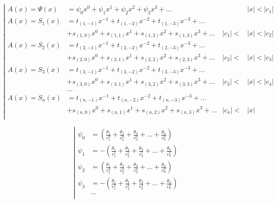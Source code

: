 \begin{equation*} \left| \begin{aligned}
A(x) = \Psi(x) &=
  \psi_0 x^0 
+ \psi_1 x^1
+ \psi_2 x^2 
+ \psi_3 x^3 
+ \ldots &
&|x| < |c_1| \\
%
A(x) = S_1(x) &= 
  t_{(1,-1)} x^{-1}
+ t_{(1,-2)} x^{-2}
+ t_{(1,-3)} x^{-3}
+ \ldots \\ &
+ s_{(1,0)} x^0
+ s_{(1,1)} x^1
+ s_{(1,2)} x^2
+ s_{(1,3)} x^3
+ \ldots &
|c_1| < &|x| < |c_2| \\
%
A(x) = S_2(x) &= 
  t_{(2,-1)} x^{-1}
+ t_{(2,-2)} x^{-2}
+ t_{(2,-3)} x^{-3}
+ \ldots \\ &
+ s_{(2,0)} x^0
+ s_{(2,1)} x^1
+ s_{(2,2)} x^2
+ s_{(2,3)} x^3
+ \ldots &
|c_2| < &|x| < |c_3| \\
%
A(x) = S_3(x) &= 
  t_{(3,-1)} x^{-1}
+ t_{(3,-2)} x^{-2}
+ t_{(3,-3)} x^{-3}
+ \ldots \\ &
+ s_{(3,0)} x^0
+ s_{(3,1)} x^1
+ s_{(3,2)} x^2
+ s_{(3,3)} x^3
+ \ldots &
|c_3| < &|x| < |c_4| \\
%
&\ldots \\
%
A(x) = S_n(x) &= 
  t_{(n,-1)} x^{-1}
+ t_{(n,-2)} x^{-2}
+ t_{(n,-3)} x^{-3}
+ \ldots \\ &
+ s_{(n,0)} x^0
+ s_{(n,1)} x^1
+ s_{(n,2)} x^2
+ s_{(n,3)} x^3
+ \ldots &
|c_n| < &|x| \\
\end{aligned} \right. \end{equation*}

\begin{equation*} \left| \begin{aligned}
\psi_0 &= \left(
  \frac{\theta_1}{c_1^0}
+ \frac{\theta_2}{c_2^0}
+ \frac{\theta_3}{c_3^0}
+ \ldots
+ \frac{\theta_n}{c_n^0} \right) \\
%
\psi_1 &= - \left(
  \frac{\theta_1}{c_1^1}
+ \frac{\theta_2}{c_2^1}
+ \frac{\theta_3}{c_3^1}
+ \ldots
+ \frac{\theta_n}{c_n^1} \right) \\
%
\psi_2 &= \left(
  \frac{\theta_1}{c_1^2}
+ \frac{\theta_2}{c_2^2}
+ \frac{\theta_3}{c_3^2}
+ \ldots
+ \frac{\theta_n}{c_n^2} \right) \\
%
\psi_3 &= - \left(
  \frac{\theta_1}{c_1^3}
+ \frac{\theta_2}{c_2^3}
+ \frac{\theta_3}{c_3^3}
+ \ldots
+ \frac{\theta_n}{c_n^3} \right) \\
%
&\ldots \\
\end{aligned} \right. \end{equation*}

